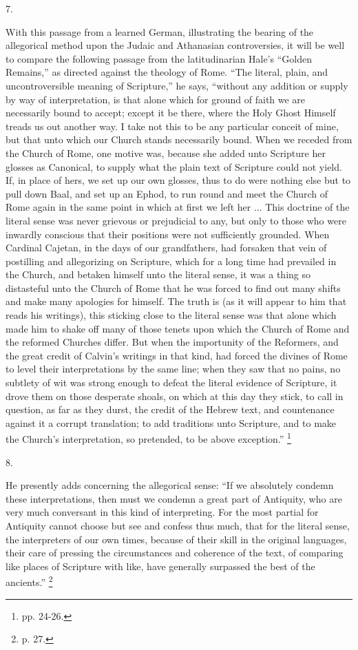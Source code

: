 7.

With this passage from a learned German, illustrating the bearing
of the allegorical method upon the Judaic and Athanasian
controversies, it will be well to compare the following passage from
the latitudinarian Hale's ``Golden Remains,'' as directed
against the theology of Rome. ``The literal, plain, and
uncontroversible meaning of Scripture,'' he says, ``without
any addition or supply by way of interpretation, is that alone which
for ground of faith we are necessarily bound to accept; except it be
there, where the Holy Ghost Himself treads us out another way. I take
not this to be any particular conceit of mine, but that unto which our
Church stands necessarily bound. When we receded from the Church of
Rome, one motive was, because she added unto Scripture her glosses as
Canonical, to supply what the plain text of Scripture could not yield.
If, in place of hers, we set up our own glosses, thus to do were
nothing else but to pull down Baal, and set up an Ephod, to run round
and meet the Church of Rome again in the same point in which at first
we left her ... This doctrine of the literal sense was never grievous
or prejudicial to any, but only to those who were inwardly conscious
that their positions were not sufficiently grounded. When Cardinal
Cajetan, in the days of our grandfathers, had forsaken that vein of
postilling and allegorizing on Scripture, which for a long time had
prevailed in the Church, and betaken himself unto the literal sense,
it was a thing so distasteful unto the Church of Rome that he was
forced to find out many shifts and make many apologies for himself.
The truth is (as it will appear to him that reads his writings), this
sticking close to the literal sense was that alone which made him to
shake off many of those tenets upon which the Church of Rome and the
reformed Churches differ. But when the importunity of the Reformers,
and the great credit of Calvin's writings in that kind, had forced the
divines of Rome to level their interpretations by the same line; when
they saw that no pains, no subtlety of wit was strong enough to defeat
the literal evidence of Scripture, it drove them on those desperate
shoals, on which at this day they stick, to call in question, as far
as they durst, the credit of the Hebrew text, and countenance against
it a corrupt translation; to add traditions unto Scripture, and to
make the Church's interpretation, so pretended, to be above
exception.'' \footnote{pp. 24-26.}

8.

He presently adds concerning the allegorical sense: ``If we
absolutely condemn these interpretations, then must we condemn a great
part of Antiquity, who are very much conversant in this kind of
interpreting. For the most partial for Antiquity cannot choose but see
and confess thus much, that for the literal sense, the interpreters of
our own times, because of their skill in the original languages, their
care of pressing the circumstances and coherence of the text, of
comparing like places of Scripture with like, have generally surpassed
the best of the ancients.'' \footnote{p. 27.}

